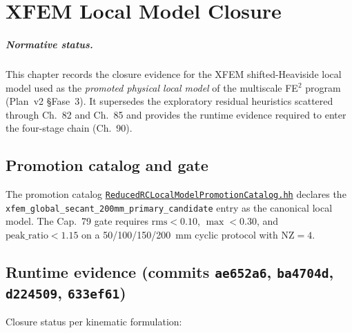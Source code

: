 
\chapter{XFEM Local Model Closure}
\label{ch:xfem-local-model-closure}

\paragraph{Normative status.}
This chapter records the closure evidence for the XFEM shifted-Heaviside
local model used as the \emph{promoted physical local model} of the
multiscale FE\(^2\) program (Plan~v2 \S Fase~3). It supersedes the
exploratory residual heuristics scattered through Ch.~82 and Ch.~85 and
provides the runtime evidence required to enter the four-stage chain
(Ch.~90).

\section{Promotion catalog and gate}

The promotion catalog
\href{run:src/validation/ReducedRCLocalModelPromotionCatalog.hh}{%
\texttt{ReducedRCLocalModelPromotionCatalog.hh}} declares the
\texttt{xfem\_global\_secant\_200mm\_primary\_candidate} entry as the
canonical local model. The Cap.~79 gate requires
\(\mathrm{rms}<0.10\), \(\max<0.30\), and \(\text{peak\_ratio}<1.15\) on a
50/100/150/200~mm cyclic protocol with \(\mathrm{NZ}=4\).

\section{Runtime evidence (commits \texttt{ae652a6}, \texttt{ba4704d},
                          \texttt{d224509}, \texttt{633ef61})}

Closure status per kinematic formulation:

